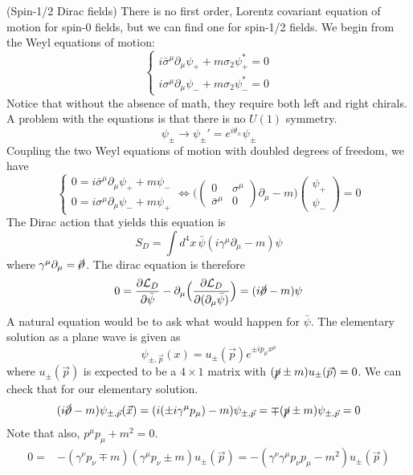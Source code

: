 \begin{defi}
(Spin-1/2 Dirac fields) There is no first order, Lorentz covariant equation of motion for spin-0 fields, but we can find one for spin-1/2 fields. We begin from the Weyl equations of motion:
\[\begin{cases}
i\bar{\sigma }^{\mu }\partial _{\mu }\psi _{+}+m\sigma _{2}\psi ^{*}_{+}=0\\
i\sigma ^{\mu }\partial _{\mu }\psi _{-}+m\sigma _{2}\psi _{-}^{*}=0
\end{cases}\]
Notice that without the absence of math, they require both left and right chirals. A problem with the equations is that there is no $U(1)$ symmetry.
\[\psi _{\pm}\rightarrow \psi _{\pm}'=e^{i\theta _{\pm}}\psi _{\pm}\]
Coupling the two Weyl equations of motion with doubled degrees of freedom, we have
\[\begin{cases}
0=i\bar{\sigma }^{\mu }\partial _{\mu }\psi _{+}+m\psi _{-}\\
0=i\sigma ^{\mu }\partial _{\mu }\psi _{-}+m\psi _{+}
\end{cases}\iff 
\Big(\begin{pmatrix}
	0&\sigma ^{\mu }\\
	\bar{\sigma }^{\mu }&0
\end{pmatrix}\partial _{\mu }-m\Big)\begin{pmatrix}
\psi _{+}\\\psi _{-}
\end{pmatrix}=0
\]
The Dirac action that yields this equation is
\[S_{D}=\int d^{4}x\,\bar{\psi }(i\gamma ^{\mu }\partial _{\mu }-m)\psi \]
where $\gamma ^{\mu }\partial _{\mu }=\cancel{\partial }$. The dirac equation is therefore
\[0=\dfrac{\partial \mathcal{L}_{D}}{\partial \bar{\psi }}-\partial _{\mu }\Big(\dfrac{\partial \mathcal{L}_{D}}{\partial (\partial _{\mu }\bar{\psi })} \Big)=(i\cancel{\partial }-m)\psi  \]
A natural equation would be to ask what would happen for $\bar{\psi }$. The elementary solution as a plane wave is given as
\[\psi _{\pm,\vec{p}}(x)=u_{\pm}(\vec{p})e^{\pm ip_{\mu }x^{\mu }}\]
where $u_{\pm}(\vec{p})$ is expected to be a $4\times 1$ matrix with $(\cancel{p}\pm m)u_{\pm}(\vec{p})=0$. We can check that for our elementary solution.
\[(i\cancel{\partial }-m)\psi _{\pm,\vec{p}}(\vec{x})=(i(\pm i\gamma ^{\mu }p_{\mu })-m)\psi _{\pm, \vec{p}}=\mp (\cancel{p}\pm m)\psi _{\pm,\vec{p}}=0\]
Note that also, $p^{\mu }p_{\mu }+m^2=0$.
\[\begin{align*}
	0=&-(\gamma ^{\nu }p_{\nu }\mp m)(\gamma ^{\mu }p_{\nu }\pm m)u_{\pm}(\vec{p})=-(\gamma ^{\nu }\gamma ^{\mu }p_{\nu }p_{\mu }-m^2)u_{\pm}(\vec{p})\\

\end{align*}\]
\end{defi}
